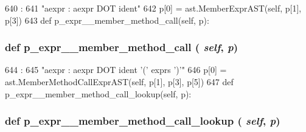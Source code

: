 \begin{DoxyCode}
640                                :
641         "aexpr : aexpr DOT ident"
642         p[0] = ast.MemberExprAST(self, p[1], p[3])
643 
    def p_expr__member_method_call(self, p):
\end{DoxyCode}
\hypertarget{classslicc_1_1parser_1_1SLICC_ab69f80240020a575538a4020423f6fb9}{
\subsubsection[{p\_\-expr\_\-\_\-member\_\-method\_\-call}]{\setlength{\rightskip}{0pt plus 5cm}def p\_\-expr\_\-\_\-member\_\-method\_\-call ( {\em self}, \/   {\em p})}}
\label{classslicc_1_1parser_1_1SLICC_ab69f80240020a575538a4020423f6fb9}



\begin{DoxyCode}
644                                            :
645         "aexpr : aexpr DOT ident '(' exprs ')'"
646         p[0] = ast.MemberMethodCallExprAST(self, p[1], p[3], p[5])
647 
    def p_expr__member_method_call_lookup(self, p):
\end{DoxyCode}
\hypertarget{classslicc_1_1parser_1_1SLICC_a9f4d3bdee654812bf1f5ad304c6770eb}{
\subsubsection[{p\_\-expr\_\-\_\-member\_\-method\_\-call\_\-lookup}]{\setlength{\rightskip}{0pt plus 5cm}def p\_\-expr\_\-\_\-member\_\-method\_\-call\_\-lookup ( {\em self}, \/   {\em p})}}
\label{classslicc_1_1parser_1_1SLICC_a9f4d3bdee654812bf1f5ad304c6770eb}



